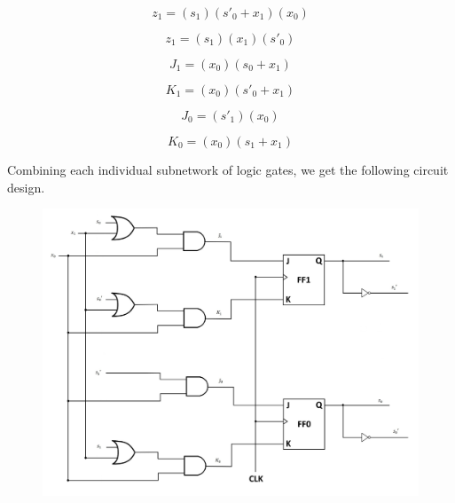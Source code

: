 \documentclass{article}
\begin{document}
\begin{equation*}
z_1 = (s_1)(s'_0 + x_1)(x_0)
\end{equation*}

\begin{equation*}
z_1 = (s_1)(x_1)(s'_0)
\end{equation*}

\begin{equation*}
J_1 = (x_0)(s_0 + x_1)
\end{equation*}

\begin{equation*}
K_1 = (x_0)(s'_0 + x_1)
\end{equation*}

\begin{equation*}
J_0 = (s'_1)(x_0)
\end{equation*}

\begin{equation*}
K_0 = (x_0)(s_1 + x_1)
\end{equation*}

Combining each individual subnetwork of logic gates, we get the following 
circuit design.

\clearpage

\begin{figure}[h!]
\centering
\includegraphics[scale=0.3]{Network}
\end{figure}
\end{document}
